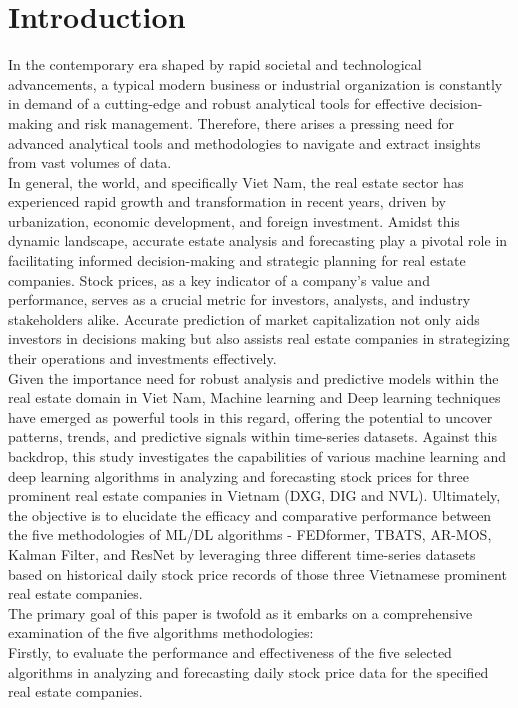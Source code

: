 \documentclass[conference]{IEEEtran}
\begin{document}
\section{\textbf{Introduction}}
In the contemporary era shaped by rapid societal and technological advancements, a typical modern business or industrial organization is constantly in demand of a cutting-edge and robust analytical tools for effective decision-making and risk management. Therefore, there arises a pressing need for advanced analytical tools and methodologies to navigate and extract insights from vast volumes of data.\\
In general, the world, and specifically Viet Nam, the real estate sector has experienced rapid growth and transformation in recent years, driven by urbanization, economic development, and foreign investment. Amidst this dynamic landscape, accurate estate analysis and forecasting play a pivotal role in facilitating informed decision-making and strategic planning for real estate companies. Stock prices, as a key indicator of a company's value and performance, serves as a crucial metric for investors, analysts, and industry stakeholders alike. Accurate prediction of market capitalization not only aids investors in decisions making but also assists real estate companies in strategizing their operations and investments effectively. \\
Given the importance need for robust analysis and predictive models within the real estate domain in Viet Nam, Machine learning and Deep learning techniques have emerged as powerful tools in this regard, offering the potential to uncover patterns, trends, and predictive signals within time-series datasets. Against this backdrop, this study investigates the capabilities of various machine learning and deep learning algorithms in analyzing and forecasting stock prices for three prominent real estate companies in Vietnam (DXG, DIG and NVL). Ultimately, the objective is to elucidate the efficacy and comparative performance between the five methodologies of ML/DL algorithms - FEDformer, TBATS, AR-MOS, Kalman Filter, and ResNet by leveraging three different time-series datasets based on historical daily stock price records of those three Vietnamese prominent real estate companies. \\
The primary goal of this paper is twofold as it embarks on a comprehensive examination of the five algorithms methodologies: \\
Firstly, to evaluate the performance and effectiveness of the five selected algorithms in analyzing and forecasting daily stock price data for the specified real estate companies.
\end{document}
